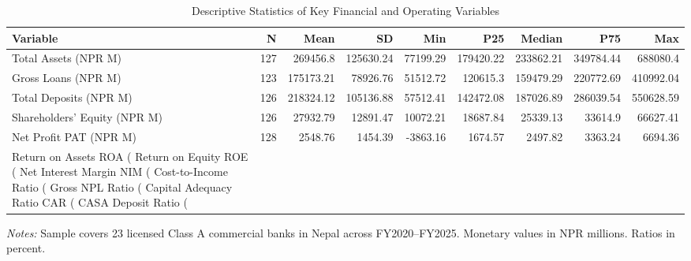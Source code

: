 \begin{table}[htbp]
\centering
\caption{Descriptive Statistics of Key Financial and Operating Variables}
\label{tab:summary_stats}
\begin{tabular}{lrrrrrrrr}
\hline\hline
Variable & N & Mean & SD & Min & P25 & Median & P75 & Max \\
\hline
Total Assets (NPR M) & 127 & 269456.8 & 125630.24 & 77199.29 & 179420.22 & 233862.21 & 349784.44 & 688080.4 \\
Gross Loans (NPR M) & 123 & 175173.21 & 78926.76 & 51512.72 & 120615.3 & 159479.29 & 220772.69 & 410992.04 \\
Total Deposits (NPR M) & 126 & 218324.12 & 105136.88 & 57512.41 & 142472.08 & 187026.89 & 286039.54 & 550628.59 \\
Shareholders' Equity (NPR M) & 126 & 27932.79 & 12891.47 & 10072.21 & 18687.84 & 25339.13 & 33614.9 & 66627.41 \\
Net Profit PAT (NPR M) & 128 & 2548.76 & 1454.39 & -3863.16 & 1674.57 & 2497.82 & 3363.24 & 6694.36 \\
Return on Assets ROA (%
Return on Equity ROE (%
Net Interest Margin NIM (%
Cost-to-Income Ratio (%
Gross NPL Ratio (%
Capital Adequacy Ratio CAR (%
CASA Deposit Ratio (%
\hline\hline
\end{tabular}
\begin{tablenotes}
\small
\item \textit{Notes:} Sample covers 23 licensed Class A commercial banks in Nepal across FY2020--FY2025. Monetary values in NPR millions. Ratios in percent.
\end{tablenotes}
\end{table}
